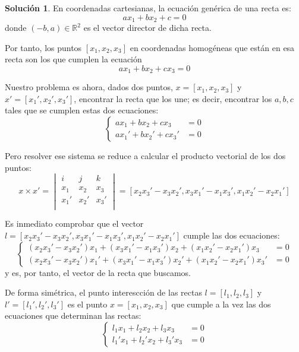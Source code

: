 \documentclass[a4paper, 11pt]{article}
\theoremstyle{definition}
\newtheorem*{solucion}{Solución}
\theoremstyle{theorem}
\begin{document}
  \begin{solucion}
      En coordenadas cartesianas, la ecuación genérica de una recta es:
      \[
      ax_1 + bx_2 + c = 0
      \]
      donde $(-b,a)\in\mathbb{R}^2$ es el vector director de dicha recta.

      Por tanto, los puntos $[x_1,x_2,x_3]$ en coordenadas homogéneas que están en esa recta son los que cumplen la ecuación
      \[
      ax_1 + bx_2 + cx_3 = 0
      \]

      Nuestro problema es ahora, dados dos puntos, $x=[x_1,x_2,x_3]$ y $x'=[x_1',x_2',x_3']$, encontrar la recta que los une; es decir, encontrar los $a,b,c$ tales que se cumplen estas dos ecuaciones:
      \[
      \begin{cases}
          ax_1 + bx_2 + cx_3 &= 0 \\
          ax_1' + bx_2' + cx_3' &= 0
      \end{cases}
      \]

      Pero resolver ese sistema se reduce a calcular el producto vectorial de los dos puntos:
      \[
      x \times x' =
      \begin{vmatrix}
          i & j & k \\
          x_1 & x_2 & x_3 \\
          x_1' & x_2' & x_3' \\
      \end{vmatrix} =
      [x_2x_3'-x_3x_2', x_3x_1'-x_1x_3', x_1x_2'-x_2x_1']
      \]

      Es inmediato comprobar que el vector $l = [x_2x_3'-x_3x_2', x_3x_1'-x_1x_3', x_1x_2'-x_2x_1']$ cumple las dos ecuaciones:
      \[
      \begin{cases}
          (x_2x_3'-x_3x_2')x_1 + (x_3x_1'-x_1x_3')x_2 + (x_1x_2'-x_2x_1')x_3 &= 0 \\
          (x_2x_3'-x_3x_2')x_1' + (x_3x_1'-x_1x_3')x_2' + (x_1x_2'-x_2x_1')x_3' &= 0
      \end{cases}
      \]
      y es, por tanto, el vector de la recta que buscamos.

      De forma simétrica, el punto interescción de las rectas $l=[l_1,l_2,l_3]$ y $l'=[l_1',l_2',l_3']$ es el punto $x=[x_1,x_2,x_3]$ que cumple a la vez las dos ecuaciones que determinan las rectas:
      \[
      \begin{cases}
          l_1x_1 + l_2x_2 + l_3x_3 &= 0 \\
          l_1'x_1 + l_2'x_2 + l_3'x_3 &= 0
      \end{cases}
      \]


\end{solucion}
\end{document}
